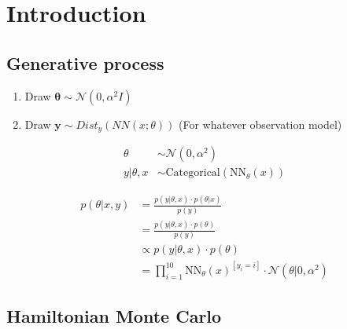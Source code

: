 \chapter{Introduction}

\section{Generative process}

\begin{enumerate}
    \item Draw $\bm \theta \sim \mathcal N (0, \alpha^2 I)$
    \item Draw $\bm y \sim Dist_y(NN(x;\theta))$ (For whatever observation model)
\end{enumerate}

\begin{align*}
    \theta &\sim \mathcal{N}(0, \alpha^2) \\
    y | \theta, x &\sim \text{Categorical}(\text{NN}_\theta(x))
\end{align*}

\begin{align*}
    p(\theta | x, y) &= \frac{p(y |\theta, x) \cdot p(\theta|x)}{p(y) } \\
                     &= \frac{p(y |\theta, x) \cdot p(\theta)}{p(y) } \\
                     &\propto p(y |\theta, x) \cdot p(\theta) \\
                     &=\prod_{i=1}^{10}\text{NN}_\theta(x)^{[ y_i = i]} \cdot \mathcal{N}(\theta | 0, \alpha^2)
\end{align*}


\section{Hamiltonian Monte Carlo}

